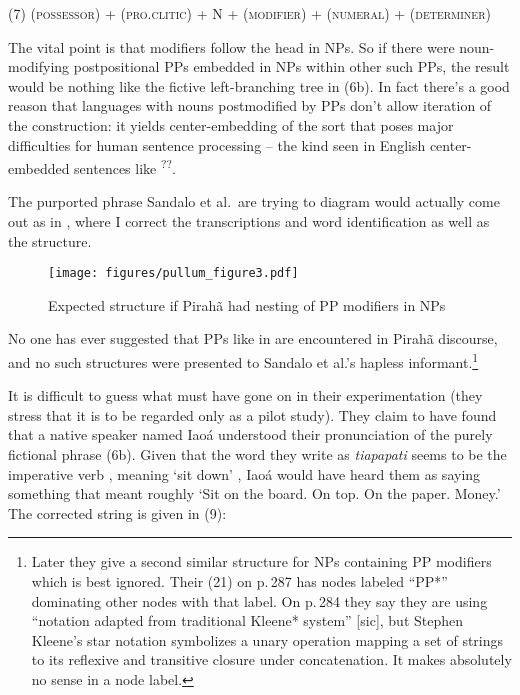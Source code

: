 \documentclass[output=paper,colorlinks,citecolor=brown
]{langscibook}
\begin{document}
\medskip\noindent
(7)\quad
(\textsc{possessor}) + (\textsc{pro.clitic}) + N + (\textsc{modifier})
+ (\textsc{numeral}) + (\textsc{determiner})

\medskip\noindent
The vital point is that modifiers follow the head in NPs. So if there
were noun-modifying postpositional PPs embedded in NPs within other
such PPs, the result would be nothing like the fictive left-branching
tree in (6b). In fact there's a good reason that languages with nouns
postmodified by PPs don't allow iteration of the construction: it
yields center-embedding of the sort that poses major difficulties for
human sentence processing -- the kind seen in English center-embedded
sentences like \textsuperscript{??}.

The purported phrase Sandalo et al.\ are trying to diagram would
actually come out as in , where I correct the transcriptions
and word identification as well as the structure.

\begin{figure}
\texttt{[image: figures/pullum\_figure3.pdf]}
\caption{Expected structure if Pirah{\~a} had nesting of PP modifiers in NPs}
\label{fig:pullum:3}
\end{figure}

No one has ever suggested that PPs like in  are
encountered in Pirah{\~a} discourse, and no such structures were
presented to Sandalo et al.'s hapless
informant.\footnote{\label{ppstarlabels}
   Later they give a second similar structure for NPs containing PP
   modifiers which is best ignored. Their (21) on p.\,287 has nodes
   labeled ``PP*'' dominating other nodes with that label. On p.\,284
   they say they are using ``notation adapted from traditional Kleene*
   system'' [sic], but Stephen Kleene's star notation symbolizes a
   unary operation mapping a set of strings to its reflexive and
   transitive closure under concatenation. It makes absolutely no
   sense in a node label.}

It is difficult to guess what must have gone on in their experimentation
(they stress that it is to be regarded only as a pilot study). They claim
to have found that a native speaker named Iao{\'a} understood their
pronunciation of the purely fictional phrase (6b). Given that the word
they write as \textit{tiapapati} seems to be the imperative verb
, meaning `sit down'
\citep[786--787]{EverGibs19}, Iao{\'a} would have heard them as
saying something that meant roughly `Sit on the board. On top. On
the paper. Money.' The corrected string is given in (9):
\end{document}
